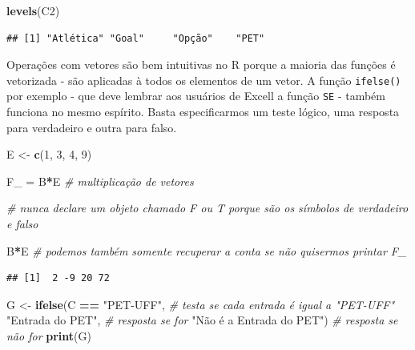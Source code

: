 \documentclass[
]{article}
\newenvironment{Shaded}{\begin{snugshade}}{\end{snugshade}}
\newcommand{\CommentTok}[1]{\textcolor[rgb]{0.56,0.35,0.01}{\textit{#1}}}
\newcommand{\DecValTok}[1]{\textcolor[rgb]{0.00,0.00,0.81}{#1}}
\newcommand{\KeywordTok}[1]{\textcolor[rgb]{0.13,0.29,0.53}{\textbf{#1}}}
\newcommand{\NormalTok}[1]{#1}
\newcommand{\OperatorTok}[1]{\textcolor[rgb]{0.81,0.36,0.00}{\textbf{#1}}}
\newcommand{\StringTok}[1]{\textcolor[rgb]{0.31,0.60,0.02}{#1}}
\begin{document}
\begin{Shaded}
\begin{Highlighting}[]
\KeywordTok{levels}\NormalTok{(C2)}
\end{Highlighting}
\end{Shaded}

\begin{verbatim}
## [1] "Atlética" "Goal"     "Opção"    "PET"
\end{verbatim}

Operações com vetores são bem intuitivas no R porque a maioria das
funções é vetorizada - são aplicadas à todos os elementos de um vetor. A
função \texttt{ifelse()} por exemplo - que deve lembrar aos usuários de
Excell a função \texttt{SE} - também funciona no mesmo espírito. Basta
especificarmos um teste lógico, uma resposta para verdadeiro e outra
para falso.

\begin{Shaded}
\begin{Highlighting}[]
\NormalTok{E <-}\StringTok{ }\KeywordTok{c}\NormalTok{(}\DecValTok{1}\NormalTok{, }\DecValTok{3}\NormalTok{, }\DecValTok{4}\NormalTok{, }\DecValTok{9}\NormalTok{)}

\NormalTok{F_ =}\StringTok{ }\NormalTok{B}\OperatorTok{*}\NormalTok{E }\CommentTok{# multiplicação de vetores}

\CommentTok{# nunca declare um objeto chamado F ou T porque são os símbolos de verdadeiro e falso}

\NormalTok{B}\OperatorTok{*}\NormalTok{E }\CommentTok{# podemos também somente recuperar a conta se não quisermos printar F_}
\end{Highlighting}
\end{Shaded}

\begin{verbatim}
## [1]  2 -9 20 72
\end{verbatim}

\begin{Shaded}
\begin{Highlighting}[]
\NormalTok{G <-}\StringTok{ }\KeywordTok{ifelse}\NormalTok{(C }\OperatorTok{==}\StringTok{ "PET-UFF"}\NormalTok{, }\CommentTok{# testa se cada entrada é igual a "PET-UFF"}
           \StringTok{"Entrada do PET"}\NormalTok{, }\CommentTok{# resposta se for}
           \StringTok{"Não é a Entrada do PET"}\NormalTok{) }\CommentTok{# resposta se não for}
\KeywordTok{print}\NormalTok{(G)}
\end{Highlighting}
\end{Shaded}
\end{document}
